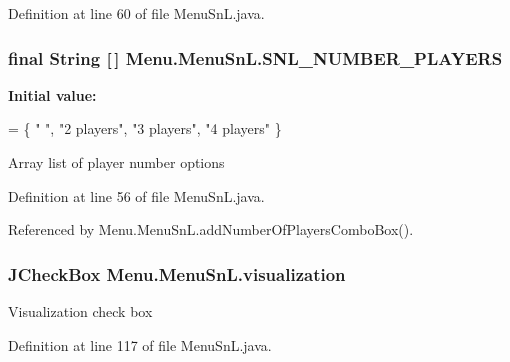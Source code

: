 Definition at line 60 of file Menu\+Sn\+L.\+java.

\hypertarget{class_menu_1_1_menu_sn_l_accdb88464884a651bab3a9ebb5eb2beb}{}
\subsubsection[{S\+N\+L\+\_\+\+N\+U\+M\+B\+E\+R\+\_\+\+P\+L\+A\+Y\+E\+R\+S}]{\setlength{\rightskip}{0pt plus 5cm}final String \mbox{[}$\,$\mbox{]} Menu.\+Menu\+Sn\+L.\+S\+N\+L\+\_\+\+N\+U\+M\+B\+E\+R\+\_\+\+P\+L\+A\+Y\+E\+R\+S\hspace{0.3cm}{\ttfamily [private]}}\label{class_menu_1_1_menu_sn_l_accdb88464884a651bab3a9ebb5eb2beb}
{\bfseries Initial value\+:}
\begin{DoxyCode}
= \{ \textcolor{stringliteral}{" "}, \textcolor{stringliteral}{"2 players"},
            \textcolor{stringliteral}{"3 players"}, \textcolor{stringliteral}{"4 players"} \}
\end{DoxyCode}
Array list of player number options 

Definition at line 56 of file Menu\+Sn\+L.\+java.



Referenced by Menu.\+Menu\+Sn\+L.\+add\+Number\+Of\+Players\+Combo\+Box().

\hypertarget{class_menu_1_1_menu_sn_l_a774bdc16dab9d1c0c882d2212beb70ac}{}
\subsubsection[{visualization}]{\setlength{\rightskip}{0pt plus 5cm}J\+Check\+Box Menu.\+Menu\+Sn\+L.\+visualization\hspace{0.3cm}{\ttfamily [private]}}\label{class_menu_1_1_menu_sn_l_a774bdc16dab9d1c0c882d2212beb70ac}
Visualization check box 

Definition at line 117 of file Menu\+Sn\+L.\+java.

\hypertarget{class_menu_1_1_menu_sn_l_a32c2e05c64b453df29d8b6df1061a939}{}
